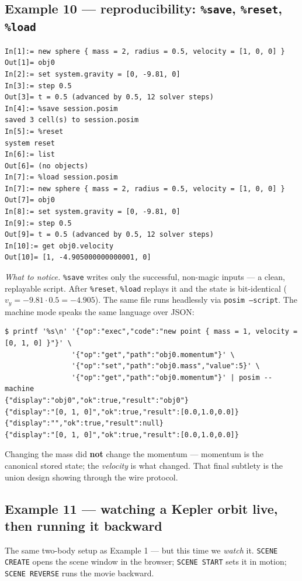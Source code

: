 \documentclass[11pt]{article}
\newcommand{\kw}[1]{\texttt{\uppercase{#1}}}
\newcommand{\code}[1]{\texttt{#1}}
\begin{document}
\subsection{Example 10 --- reproducibility: \code{\%save}, \code{\%reset}, \code{\%load}}

\begin{lstlisting}
In[1]:= new sphere { mass = 2, radius = 0.5, velocity = [1, 0, 0] }
Out[1]= obj0
In[2]:= set system.gravity = [0, -9.81, 0]
In[3]:= step 0.5
Out[3]= t = 0.5 (advanced by 0.5, 12 solver steps)
In[4]:= %save session.posim
saved 3 cell(s) to session.posim
In[5]:= %reset
system reset
In[6]:= list
Out[6]= (no objects)
In[7]:= %load session.posim
In[7]:= new sphere { mass = 2, radius = 0.5, velocity = [1, 0, 0] }
Out[7]= obj0
In[8]:= set system.gravity = [0, -9.81, 0]
In[9]:= step 0.5
Out[9]= t = 0.5 (advanced by 0.5, 12 solver steps)
In[10]:= get obj0.velocity
Out[10]= [1, -4.905000000000001, 0]
\end{lstlisting}

\emph{What to notice.} \code{\%save} writes only the successful,
non-magic inputs --- a clean, replayable script. After \code{\%reset},
\code{\%load} replays it and the state is bit-identical
($v_y = -9.81\cdot0.5 = -4.905$). The same file runs headlessly via
\code{posim --script}. The machine mode speaks the same language over
JSON:

\begin{lstlisting}
$ printf '%s\n' '{"op":"exec","code":"new point { mass = 1, velocity = [0, 1, 0] }"}' \
                '{"op":"get","path":"obj0.momentum"}' \
                '{"op":"set","path":"obj0.mass","value":5}' \
                '{"op":"get","path":"obj0.momentum"}' | posim --machine
{"display":"obj0","ok":true,"result":"obj0"}
{"display":"[0, 1, 0]","ok":true,"result":[0.0,1.0,0.0]}
{"display":"","ok":true,"result":null}
{"display":"[0, 1, 0]","ok":true,"result":[0.0,1.0,0.0]}
\end{lstlisting}

Changing the mass did \textbf{not} change the momentum --- momentum is
the canonical stored state; the \emph{velocity} is what changed. That
final subtlety is the union design showing through the wire protocol.

\subsection{Example 11 --- watching a Kepler orbit live, then running it backward}

The same two-body setup as Example 1 --- but this time we \emph{watch}
it. \kw{scene create} opens the scene window in the browser;
\kw{scene start} sets it in motion; \kw{scene reverse} runs the movie
backward.
\end{document}
